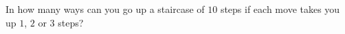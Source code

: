 In how many ways can you go up a staircase of $10$ steps if each move takes you up $1$, $2$ or $3$ steps?
